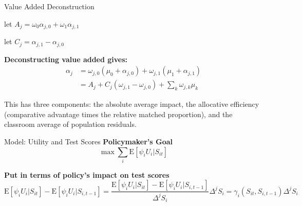 \documentclass[t,aspectratio=169]{beamer}
\newcommand{\E}{\mathrm{E}}
\begin{document}
    \begin{frame}{Value Added Deconstruction}

    let $A_j = \omega_{0}\alpha_{j,0} + \omega_{1}\alpha_{j,1}$ 
    
    let $C_j = \alpha_{j,1} - \alpha_{j,0}$

    \vspace{1em}
    \textbf{Deconstructing value added gives:}
            \begin{align*}
            \alpha_j  &= \omega_{j,0}(\mu_0 +\alpha_{j,0}) + \omega_{j,1}(\mu_1 +\alpha_{j,1})  \\
                      &  =  A_j  + C_j  ( \omega_{j,1} - \omega_{j,0} ) + \sum_k  \omega_{j,k} \mu_k
        \end{align*}

    
        This has three components: the absolute average impact, the allocative efficiency (comparative advantage times the relative matched proportion), and the classroom average of population residuals.
        
    \end{frame}
     
    \begin{frame}{Model: Utility and Test Scores}
    \vspace{2em}
    \textbf{Policymaker's Goal}
    \begin{equation}
        \max \sum_i \E[ \psi_i U_{i} |S_{it}]
    \end{equation}
    
    \vspace{3em
    }
    \textbf{Put in terms of policy's impact on test scores }
        \begin{equation}
            \E[\psi_i U_i|S_{it}] - \E[\psi_i U_i |S_{i,t-1}] =  \frac{\E[\psi_i U_i|S_{it}] - \E[\psi_i U_i |S_{i,t-1}] }{\Delta^jS_i} \Delta^jS_i = \gamma_i(S_{it}, S_{i,t-1}) \Delta^jS_i
        \end{equation}
     
    \end{frame}
        
\end{document}
